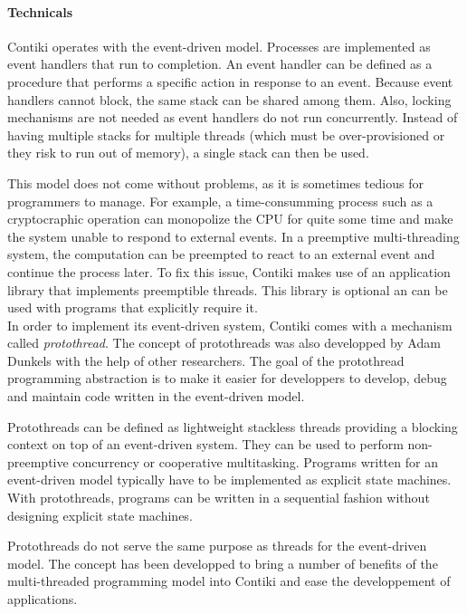 \paragraph{Technicals} Contiki operates with the event-driven model.
Processes are implemented as event handlers that run to completion.
An event handler can be defined as a procedure that performs a specific action in response to an event.
Because event handlers cannot block, the same stack can be shared among them.
Also, locking mechanisms are not needed as event handlers do not run concurrently.
Instead of having multiple stacks for multiple threads (which must be over-provisioned or they risk to run out of memory), a single stack can then be used.

This model does not come without problems, as it is sometimes tedious for programmers to manage.
For example, a time-consumming process such as a cryptocraphic operation can monopolize the CPU for quite some time 
    and make the system unable to respond to external events. 
In a preemptive multi-threading system, the computation can be preempted to react to an external event 
    and continue the process later.
To fix this issue, Contiki makes use of an application library that implements preemptible threads.
This library is optional an can be used with programs that explicitly require it.\\

In order to implement its event-driven system, Contiki comes with a mechanism called \textit{protothread}\cite{protothreads}.
The concept of protothreads was also developped by Adam Dunkels with the help of other researchers.
The goal of the protothread programming abstraction is to make it easier for developpers to develop, debug and maintain code written in the event-driven model.

Protothreads can be defined as lightweight stackless threads providing a blocking context on top of an event-driven system.
They can be used to perform non-preemptive concurrency or cooperative multitasking.
Programs written for an event-driven model typically have to be implemented as explicit state machines.
With protothreads, programs can be written in a sequential fashion without designing explicit state machines.

Protothreads do not serve the same purpose as threads for the event-driven model.
The concept has been developped to bring a number of benefits of the multi-threaded programming model into Contiki
    and ease the developpement of applications.\\


